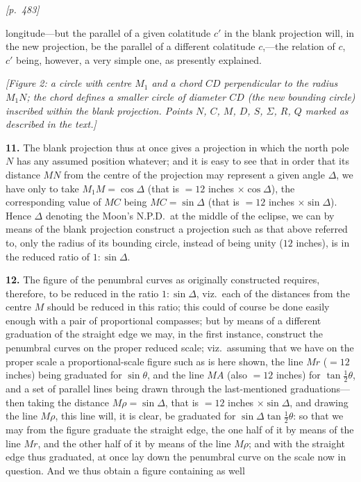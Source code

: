 \documentclass[11pt]{article}
\begin{document}
\medskip

\noindent\textit{[p.~483]}

\medskip

longitude---but the parallel of a given colatitude $c'$ in the blank
projection will, in the new projection, be the parallel of a different
colatitude $c$,---the relation of $c$, $c'$ being, however, a very simple
one, as presently explained.

\medskip

\begin{center}
\textit{[Figure 2: a circle with centre $M_{1}$ and a chord $CD$
perpendicular to the radius $M_{1}N$; the chord defines a smaller circle
of diameter $CD$ (the new bounding circle) inscribed within the blank
projection. Points $N$, $C$, $M$, $D$, $S$, $\Sigma$, $R$, $Q$ marked as
described in the text.]}
\end{center}

\smallskip

\textbf{11.} The blank projection thus at once gives a projection in
which the north pole $N$ has any assumed position whatever; and it is
easy to see that in order that its distance $MN$ from the centre of the
projection may represent a given angle $\Delta$, we have only to take
$M_{1}M = \cos\Delta$ (that is $=12$ inches $\times\cos\Delta$), the
corresponding value of $MC$ being $MC = \sin\Delta$ (that is $=12$ inches
$\times\sin\Delta$). Hence $\Delta$ denoting the Moon's N.P.D.\ at the
middle of the eclipse, we can by means of the blank projection construct
a projection such as that above referred to, only the radius of its
bounding circle, instead of being unity ($12$ inches), is in the reduced
ratio of $1 : \sin\Delta$.

\medskip

\textbf{12.} The figure of the penumbral curves as originally constructed
requires, therefore, to be reduced in the ratio $1 : \sin\Delta$, viz.\
each of the distances from the centre $M$ should be reduced in this
ratio; this could of course be done easily enough with a pair of
proportional compasses; but by means of a different graduation of the
straight edge we may, in the first instance, construct the penumbral
curves on the proper reduced scale; viz.\ assuming that we have on the
proper scale a proportional-scale figure such as is here shown, the line
$Mr$ ($=12$ inches) being graduated for $\sin\theta$, and the line $MA$
(also $=12$ inches) for $\tan\tfrac{1}{2}\theta$, and a set of parallel
lines being drawn through the last-mentioned graduations---then taking
the distance $M\rho = \sin\Delta$, that is $=12$ inches $\times\sin\Delta$,
and drawing the line $M\rho$, this line will, it is clear, be graduated
for $\sin\Delta\tan\tfrac{1}{2}\theta$: so that we may from the figure
graduate the straight edge, the one half of it by means of the line $Mr$,
and the other half of it by means of the line $M\rho$; and with the
straight edge thus graduated, at once lay down the penumbral curve on the
scale now in question. And we thus obtain a figure containing as well
\end{document}
